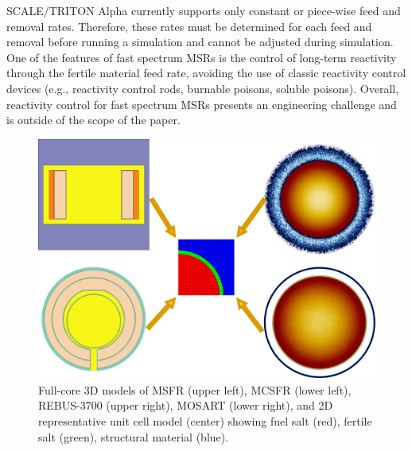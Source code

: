 \documentclass{anstrans}
\begin{document}
SCALE/TRITON Alpha currently supports only constant or piece-wise feed and removal rates. Therefore, these rates must be determined for each feed and removal before running a simulation and cannot be adjusted during simulation. One of the features of fast spectrum \gls{MSR}s is the control of long-term reactivity through the fertile material feed rate, avoiding the use of classic reactivity control devices (e.g., reactivity control rods, burnable poisons, soluble poisons). Overall, reactivity control for fast spectrum \gls{MSR}s presents an engineering challenge and is outside of the scope of the paper.
\begin{figure}[!htb]
  \centering
  \includegraphics[scale=0.265]{./Figures/fsmsrs.pdf}
  \caption{Full-core 3D models of \gls{MSFR} (upper left), \gls{MCSFR} (lower left), REBUS-3700 (upper right), \gls{MOSART} (lower right), and 2D representative unit cell model (center) showing fuel salt (red), fertile salt (green), structural material (blue).}  
  \vspace{-0.15in}
  \label{fig:unit_cell}
\end{figure}
\end{document}
